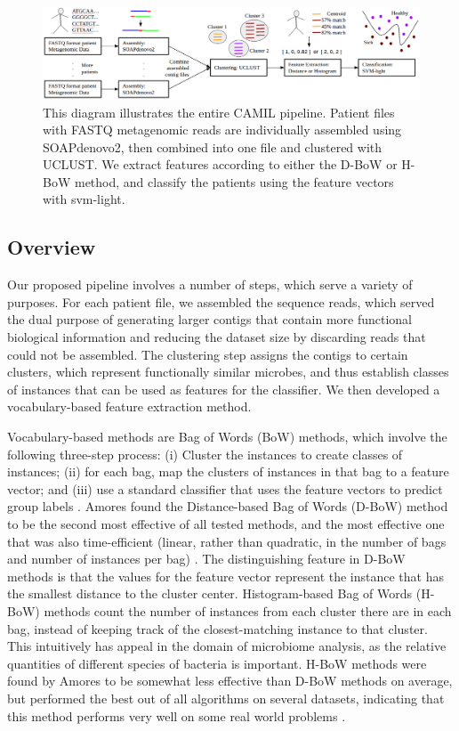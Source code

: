 
\begin{figure}[t]
\centering
\includegraphics[scale=0.5]{./mil-metagenomics-pipeline.png}
\caption{This diagram illustrates the entire CAMIL pipeline. Patient files with FASTQ metagenomic reads are individually assembled using SOAPdenovo2, then combined into one file and clustered with UCLUST. We extract features according to either the D-BoW or H-BoW method, and classify the patients using the feature vectors with svm-light.} \label{pipeline}
\end{figure}

\subsection{Overview}

Our proposed pipeline involves a number of steps, which serve a variety of purposes. For each patient file, we assembled the sequence reads, which served the dual purpose of generating larger contigs that contain more functional biological information and reducing the dataset size by discarding reads that could not be assembled. The clustering step assigns the contigs to certain clusters, which represent functionally similar microbes, and thus establish classes of instances that can be used as features for the classifier. We then developed a vocabulary-based feature extraction method.

Vocabulary-based methods are Bag of Words (BoW) methods, which involve the following three-step process: (i) Cluster the instances to create classes of instances; (ii) for each bag, map the clusters of instances in that bag to a feature vector; and (iii) use a standard classifier that uses the feature vectors to predict group labels \cite{amores13}. Amores found the Distance-based Bag of Words (D-BoW) method to be the second most effective of all tested methods, and the most effective one that was also time-efficient (linear, rather than quadratic, in the number of bags and number of instances per bag) \cite{amores13}. The distinguishing feature in D-BoW methods is that the values for the feature vector represent the instance that has the smallest distance to the cluster center. Histogram-based Bag of Words (H-BoW) methods count the number of instances from each cluster there are in each bag, instead of keeping track of the closest-matching instance to that cluster. This intuitively has appeal in the domain of microbiome analysis, as the relative quantities of different species of bacteria is important. H-BoW methods were found by Amores to be somewhat less effective than D-BoW methods on average, but performed the best out of all algorithms on several datasets, indicating that this method performs very well on some real world problems \cite{amores13}.

